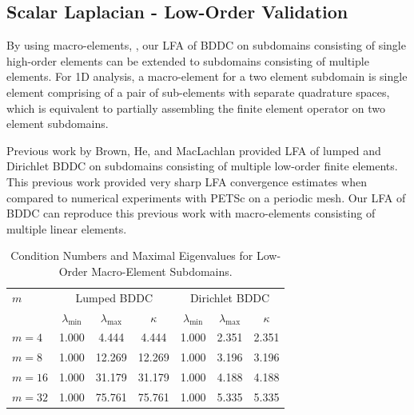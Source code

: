 \documentclass[review]{siamart190516}
\begin{document}
\subsection{Scalar Laplacian - Low-Order Validation}\label{sec:lowordervalidate}

By using macro-elements, \cite{kumar2019local, brown2019local}, our LFA of BDDC on subdomains consisting of single high-order elements can be extended to subdomains consisting of multiple elements.
For 1D analysis, a macro-element for a two element subdomain is single element comprising of a pair of sub-elements with separate quadrature spaces, which is equivalent to partially assembling the finite element operator on two element subdomains.

Previous work by Brown, He, and MacLachlan \cite{brown2019local} provided LFA of lumped and Dirichlet BDDC on subdomains consisting of multiple low-order finite elements.
This previous work provided very sharp LFA convergence estimates when compared to numerical experiments with PETSc \cite{petsc-user-ref} on a periodic mesh.
Our LFA of BDDC can reproduce this previous work with macro-elements consisting of multiple linear elements.

\begin{table}[ht!]
\begin{center}
\begin{tabular}{l ccc ccc}
  \toprule
  $m$  &  \multicolumn{3}{c}{Lumped BDDC}  &  \multicolumn{3}{c}{Dirichlet BDDC}  \\
                      &  $\lambda_{\min}$  &  $\lambda_{\max}$  &  $\kappa$ & $\lambda_{\min}$  &  $\lambda_{\max}$ & $\kappa$  \\
  \toprule
  $m = 4$   &  1.000  &   4.444  &   4.444  &  1.000  &  2.351  &  2.351  \\
  $m = 8$   &  1.000  &  12.269  &  12.269  &  1.000  &  3.196  &  3.196  \\
  $m = 16$  &  1.000  &  31.179  &  31.179  &  1.000  &  4.188  &  4.188  \\
  $m = 32$  &  1.000  &  75.761  &  75.761  &  1.000  &  5.335  &  5.335  \\
  \bottomrule
\end{tabular}
\end{center}
\caption{Condition Numbers and Maximal Eigenvalues for Low-Order Macro-Element Subdomains.}
\label{table:macro_element_bddc}
\end{table}
\end{document}
